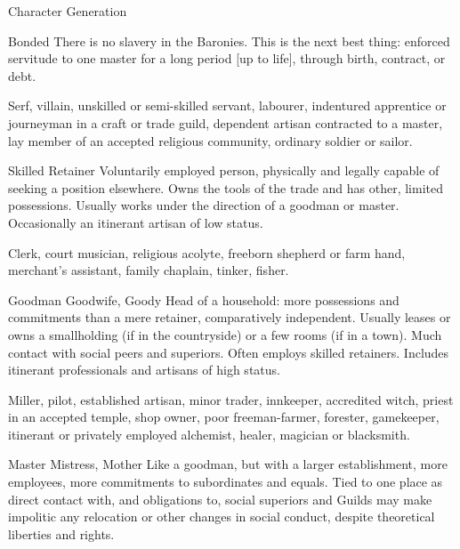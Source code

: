 \begin{Chapter}{Character Generation}
\begin{Description}
\item[Bonded] There is no slavery in the Baronies. This is the next
  best thing: enforced servitude to one master for a long period [up
    to life], through birth, contract, or debt.
  
  \begin{example}
    Serf, villain, unskilled or semi-skilled servant, labourer,
    indentured apprentice or journeyman in a craft or trade guild,
    dependent artisan contracted to a master, lay member of an
    accepted religious community, ordinary soldier or sailor.
  \end{example}

\item[Skilled Retainer] Voluntarily employed person, physically and
  legally capable of seeking a position elsewhere.  Owns the tools of
  the trade and has other, limited possessions. Usually works under
  the direction of a goodman or master. Occasionally an itinerant
  artisan of low status.

  \begin{example}
    Clerk, court musician, religious acolyte, freeborn shepherd or
    farm hand, merchant’s assistant, family chaplain, tinker, fisher.
  \end{example}

\item[Goodman \lbrack Goodwife, Goody\rbrack] Head of a household:
  more possessions and commitments than a mere retainer, comparatively
  independent.  Usually leases or owns a smallholding (if in the
  countryside) or a few rooms (if in a town).  Much contact with
  social peers and superiors.  Often employs skilled retainers.
  Includes itinerant professionals and artisans of high status.

    \begin{example} 
      Miller, pilot, established artisan, minor trader, innkeeper,
      accredited witch, priest in an accepted temple, shop owner, poor
      freeman-farmer, forester, gamekeeper, itinerant or privately
      employed alchemist, healer, magician or blacksmith.
    \end{example}
    
\item[Master \lbrack Mistress, Mother\rbrack] Like a goodman, but with
  a larger establishment, more employees, more commitments to
  subordinates and equals.  Tied to one place as direct contact with,
  and obligations to, social superiors and Guilds may make impolitic
  any relocation or other changes in social conduct, despite
  theoretical liberties and rights.


\end{Description}
\end{Chapter}
